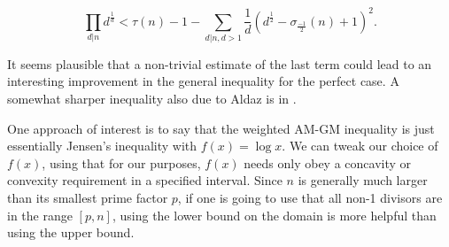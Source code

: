 \documentclass{article}
\begin{document}
\begin{equation} \prod_{d|n}d^{\frac{1}{d}} < \tau(n)-1  - \sum_{d|n, d>1} \frac{1}{d}\left(d^{\frac{1}{2}} - \sigma_{\frac{-1}{2}}(n) +1 \right)^2. 
\end{equation}


It seems plausible that a non-trivial estimate of the last term could lead to an interesting improvement in the general inequality for the perfect case. A somewhat sharper inequality also due to Aldaz is in \cite{Aldaz2}.


One approach of interest is to say that the weighted AM-GM inequality is just essentially Jensen's inequality with $f(x) = \log x$. We can tweak our choice of $f(x)$, using that for our purposes, $f(x)$ needs only obey a concavity or convexity requirement in a specified interval. Since $n$ is generally much larger than its smallest prime factor $p$, if one is going to use that all non-1 divisors are in the range $[p,n]$, using the lower bound on the domain is more helpful than using the upper bound.





\end{document}
